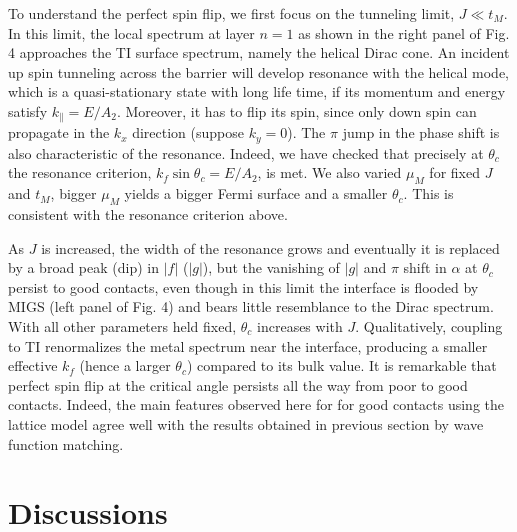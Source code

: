 To understand the perfect spin flip, we first focus on 
the tunneling limit, $J\ll t_M$. In this limit, the local spectrum at layer $n=1$ as shown
in the right panel of Fig. 4 approaches
the TI surface spectrum, namely the helical Dirac cone. An incident up spin 
tunneling across the barrier will develop resonance with the helical mode, which is
a quasi-stationary state with long life time, if its 
momentum and energy satisfy $k_\parallel=E/A_2$. Moreover, it has to flip its spin, since 
only down spin can propagate in the $k_x$ direction (suppose $k_y=0$). 
The $\pi$ jump in the phase shift is also characteristic of the resonance. Indeed,
we have checked that precisely at $\theta_c$ the resonance criterion, $k_f\sin\theta_c=E/A_2$, 
is met.
We also varied $\mu_M$ for fixed $J$ and $t_M$, bigger $\mu_M$ 
yields a bigger Fermi surface and a smaller $\theta_c$. This is consistent with 
the resonance criterion above.

As $J$ is increased, the width of the resonance grows and eventually it is replaced by a 
broad peak (dip) in $|f|$ ($|g|$), but the vanishing of $|g|$ and $\pi$
shift in $\alpha$ at $\theta_c$ persist to good contacts,
even though in this limit the interface is flooded by MIGS (left panel of Fig. 4) 
and bears little resemblance to the Dirac spectrum.
With all other parameters held fixed, $\theta_c$ increases with $J$. Qualitatively,
coupling to TI renormalizes the metal spectrum near the interface, producing a smaller effective $k_f$ (hence a larger $\theta_c$) compared to its bulk value. 
It is remarkable that perfect spin flip at the critical angle persists all
the way from poor to good contacts. Indeed, the main features observed here for
for good contacts using the lattice model 
agree well with the results obtained in previous section by wave function matching. 

\section{Discussions}

